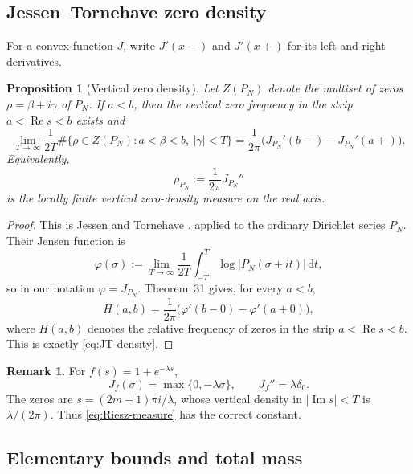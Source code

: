 \documentclass[11pt]{article}
\newtheorem{proposition}[theorem]{Proposition}
\theoremstyle{definition}
\newtheorem{remark}[theorem]{Remark}
\newcommand{\dd}{\,\mathrm d}
\newcommand{\Ree}{\operatorname{Re}}
\newcommand{\Ims}{\operatorname{Im}}
\newcommand{\1}{\mathbf 1}
\begin{document}
\subsection{Jessen--Tornehave zero density}

For a convex function $J$, write $J'(x-)$ and $J'(x+)$ for its left and right derivatives.

\begin{proposition}[Vertical zero density]\label{prop:JT-density}
Let $Z(P_N)$ denote the multiset of zeros $\rho=\beta+i\gamma$ of $P_N$.  If $a<b$, then the vertical zero frequency in the strip $a<\Ree s<b$ exists and
\begin{equation}\label{eq:JT-density}
\lim_{T\to\infty}\frac1{2T}
\#\{\rho\in Z(P_N):a<\beta<b,\ |\gamma|<T\}
=
\frac1{2\pi}
\bigl(J_{P_N}'(b-)-J_{P_N}'(a+)\bigr).
\end{equation}
  Equivalently,
\begin{equation}\label{eq:Riesz-measure}
\rho_{P_N}:=\frac1{2\pi}J_{P_N}''
\end{equation}
is the locally finite vertical zero-density measure on the real axis.
\end{proposition}

\begin{proof}
	This is Jessen and Tornehave
	\cite[Theorem~31]{JessenTornehave1945}, applied to the ordinary
	Dirichlet series $P_N$.  Their Jensen function is
	\[
	\varphi(\sigma)
	:=
	\lim_{T\to\infty}\frac1{2T}
	\int_{-T}^{T}\log|P_N(\sigma+it)|\dd t,
	\]
	so in our notation $\varphi=J_{P_N}$.  Theorem~31 gives, for every
	$a<b$,
	\[
	H(a,b)
	=
	\frac1{2\pi}
	\bigl(\varphi'(b-0)-\varphi'(a+0)\bigr),
	\]
	where $H(a,b)$ denotes the relative frequency of zeros in the strip
	$a<\Ree s<b$.  This is exactly \eqref{eq:JT-density}.
\end{proof}

\begin{remark}\label{rem:normalization-check}
For $f(s)=1+e^{-\lambda s}$,
\[
J_f(\sigma)=\max\{0,-\lambda\sigma\},
\qquad
J_f''=\lambda\delta_0.
\]
The zeros are $s=(2m+1)\pi i/\lambda$, whose vertical density in $|\Ims s|<T$ is $\lambda/(2\pi)$.  Thus \eqref{eq:Riesz-measure} has the correct constant.
\end{remark}

\subsection{Elementary bounds and total mass}
\end{document}
